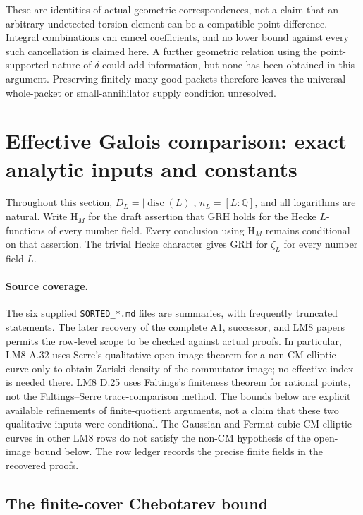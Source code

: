 \documentclass[11pt,a4paper]{article}
\begin{document}
These are identities of actual geometric correspondences, not a
claim that an arbitrary undetected torsion element can be a
compatible point difference. Integral combinations can cancel
coefficients, and no lower bound against every such cancellation
is claimed here. A further geometric relation using the
point-supported nature of $\delta$ could add information, but
none has been obtained in this argument. Preserving finitely many
good packets therefore leaves the universal whole-packet or
small-annihilator supply condition unresolved.


\section{Effective Galois comparison: exact analytic inputs and constants}
\label{sec:effective-galois}

Throughout this section, $D_L=|\operatorname{disc}(L)|$, $n_L=[L:\mathbb Q]$, and all logarithms are natural.  Write $\mathrm{H}_M$ for the draft assertion that GRH holds for the Hecke $L$-functions of every number field.  Every conclusion using $\mathrm{H}_M$ remains conditional on that assertion.  The trivial Hecke character gives GRH for $\zeta_L$ for every number field $L$.

\paragraph{Source coverage.}
The six supplied \texttt{SORTED\_*.md} files are summaries, with frequently truncated statements.  The later recovery of the complete A1, successor, and LM8 papers permits the row-level scope to be checked against actual proofs.  In particular, LM8 A.32 uses Serre's qualitative open-image theorem for a non-CM elliptic curve only to obtain Zariski density of the commutator image; no effective index is needed there.  LM8 D.25 uses Faltings's finiteness theorem for rational points, not the Faltings--Serre trace-comparison method.  The bounds below are explicit available refinements of finite-quotient arguments, not a claim that these two qualitative inputs were conditional.  The Gaussian and Fermat-cubic CM elliptic curves in other LM8 rows do not satisfy the non-CM hypothesis of the open-image bound below.  The row ledger records the precise finite fields in the recovered proofs.

\subsection{The finite-cover Chebotarev bound}
\end{document}
